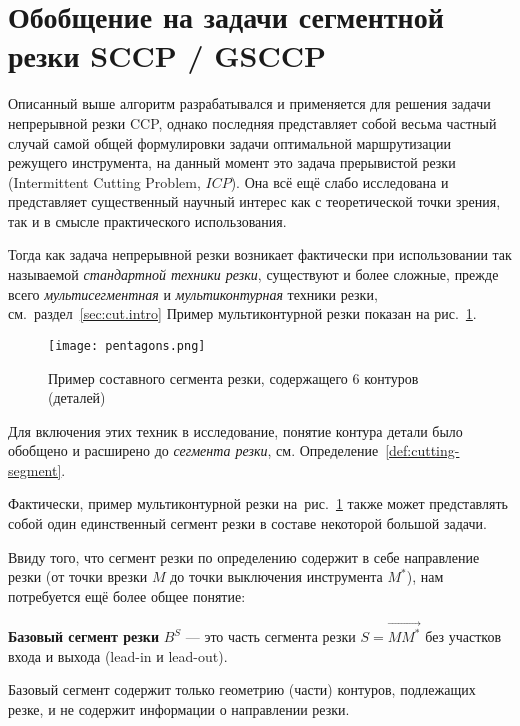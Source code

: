 
\section{%
Обобщение на задачи сегментной резки SCCP / GSCCP
}
\label{sec:ccp.gsccp}

Описанный выше алгоритм разрабатывался и применяется
для решения задачи непрерывной резки CCP,
однако последняя представляет собой весьма
частный случай самой общей формулировки
задачи оптимальной маршрутизации режущего инструмента,
на данный момент это задача прерывистой резки
(Intermittent Cutting Problem, $ICP$).
Она всё ещё слабо исследована
и представляет существенный научный интерес
как с теоретической точки зрения,
так и в смысле практического использования.

Тогда как задача непрерывной резки возникает фактически
при использовании так называемой
\textit{стандартной техники резки},
существуют и более сложные,
прежде всего
\textit{мультисегментная}
и
\textit{мультиконтурная}
техники резки,
см.~раздел~\ref{sec:cut.intro}
Пример мультиконтурной резки
показан на рис.~\ref{fig:ccp-6x5}.

\begin{figure}
  \centering
  \texttt{[image: pentagons.png]}
  \caption{Пример составного сегмента резки, содержащего 6 контуров (деталей)}
  \label{fig:ccp-6x5}
\end{figure}

Для включения этих техник в исследование,
понятие контура детали было обобщено
\cite{bib:petunin-2019}
и расширено до
\textit{сегмента резки},
см. Определение~\ref{def:cutting-segment}.

Фактически, пример мультиконтурной резки на~рис.~\ref{fig:ccp-6x5}
также может представлять собой один единственный
сегмент резки в составе некоторой большой задачи.

Ввиду того,
что сегмент резки по определению содержит в себе
направление резки
(от точки врезки $M$ до точки выключения инструмента $M^*$),
нам потребуется ещё более общее понятие:

\begin{opred}
  \textbf{Базовый сегмент резки}
  $B^S$
  ---
  это часть сегмента резки
  $S = \overrightarrow{M M^*}$
  без участков входа и выхода
  (lead-in и lead-out).
\end{opred}

Базовый сегмент содержит только геометрию
(части) контуров, подлежащих резке,
и не содержит информации о направлении резки.

